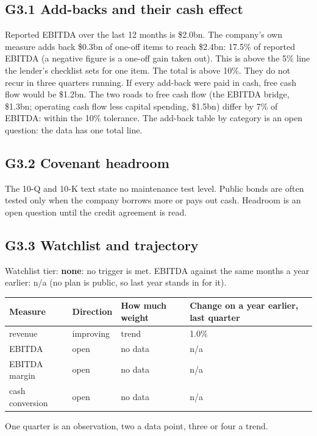 \documentclass[11pt,a4paper]{article}
\begin{document}
\subsection*{G3.1 Add-backs and their cash effect}
Reported EBITDA over the last 12 months is \$2.0bn. The company's own measure adds back \$0.3bn of one-off items to reach \$2.4bn: 17.5\% of reported EBITDA (a negative figure is a one-off gain taken out). This is above the 5\% line the lender's checklist sets for one item. The total is above 10\%. They do not recur in three quarters running. If every add-back were paid in cash, free cash flow would be \$1.2bn. The two roads to free cash flow (the EBITDA bridge, \$1.3bn; operating cash flow less capital spending, \$1.5bn) differ by 7\% of EBITDA: within the 10\% tolerance. The add-back table by category is an open question: the data has one total line.
\subsection*{G3.2 Covenant headroom}
The 10-Q and 10-K text state no maintenance test level. Public bonds are often tested only when the company borrows more or pays out cash. Headroom is an open question until the credit agreement is read.
\subsection*{G3.3 Watchlist and trajectory}
Watchlist tier: \textbf{none}: no trigger is met. EBITDA against the same months a year earlier: n/a (no plan is public, so last year stands in for it).
\begin{center}\footnotesize\setlength{\tabcolsep}{3.5pt}\begin{tabular}{@{}llll@{}}\toprule
Measure & Direction & How much weight & Change on a year earlier, last quarter \\\midrule
revenue & improving & trend & 1.0\% \\
EBITDA & open & no data & n/a \\
EBITDA margin & open & no data & n/a \\
cash conversion & open & no data & n/a \\
\bottomrule\end{tabular}\end{center}
One quarter is an observation, two a data point, three or four a trend.
\end{document}
